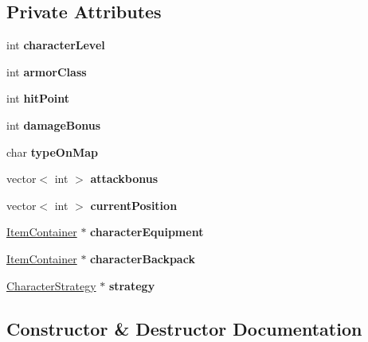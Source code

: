 \subsection*{Private Attributes}
\begin{DoxyCompactItemize}
\item 
\hypertarget{class_character_a8aed190fb73f03d060dbd7ee4b6b3391}{}\label{class_character_a8aed190fb73f03d060dbd7ee4b6b3391} 
int {\bfseries character\+Level}
\item 
\hypertarget{class_character_ac41230fc7770d66c3176c59fc2d7b920}{}\label{class_character_ac41230fc7770d66c3176c59fc2d7b920} 
int {\bfseries armor\+Class}
\item 
\hypertarget{class_character_a50cc50f1f462fedccb1f9e6355738bdf}{}\label{class_character_a50cc50f1f462fedccb1f9e6355738bdf} 
int {\bfseries hit\+Point}
\item 
\hypertarget{class_character_a576933c7dfea905a1608b9d438796d78}{}\label{class_character_a576933c7dfea905a1608b9d438796d78} 
int {\bfseries damage\+Bonus}
\item 
\hypertarget{class_character_ac624bfa669630a0d1fd7c1d46ecc0756}{}\label{class_character_ac624bfa669630a0d1fd7c1d46ecc0756} 
char {\bfseries type\+On\+Map}
\item 
\hypertarget{class_character_a1e7de8a1fe970363e5ec873586aa412e}{}\label{class_character_a1e7de8a1fe970363e5ec873586aa412e} 
vector$<$ int $>$ {\bfseries attackbonus}
\item 
\hypertarget{class_character_a314c290654d0c270c3705cd66d83c405}{}\label{class_character_a314c290654d0c270c3705cd66d83c405} 
vector$<$ int $>$ {\bfseries current\+Position}
\item 
\hypertarget{class_character_a6c60eb59643e6505e046fc71baf7e08e}{}\label{class_character_a6c60eb59643e6505e046fc71baf7e08e} 
\hyperlink{class_item_container}{Item\+Container} $\ast$ {\bfseries character\+Equipment}
\item 
\hypertarget{class_character_aa85ed969bf710290931caafd46054b82}{}\label{class_character_aa85ed969bf710290931caafd46054b82} 
\hyperlink{class_item_container}{Item\+Container} $\ast$ {\bfseries character\+Backpack}
\item 
\hypertarget{class_character_aa5782939d974e3f1be1b51e353bb0d47}{}\label{class_character_aa5782939d974e3f1be1b51e353bb0d47} 
\hyperlink{class_character_strategy}{Character\+Strategy} $\ast$ {\bfseries strategy}
\end{DoxyCompactItemize}


\subsection{Constructor \& Destructor Documentation}
\hypertarget{class_character_adc27bdd255876169bad2ed0bae0cffb5}{}\label{class_character_adc27bdd255876169bad2ed0bae0cffb5} 
